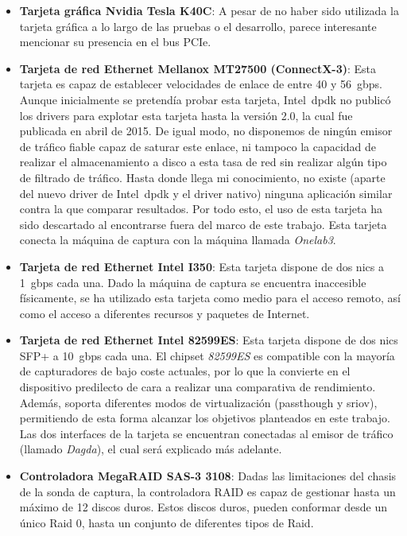 \begin{itemize}
\item \textbf{Tarjeta gráfica Nvidia Tesla K40C}: A pesar de no haber sido utilizada la tarjeta gráfica a lo largo de las pruebas o el desarrollo, parece interesante mencionar su presencia en el bus PCIe.

\item \textbf{Tarjeta de red Ethernet Mellanox MT27500 (ConnectX-3)}: Esta tarjeta es capaz de establecer velocidades de enlace de entre 40 y 56~\gls{gbps}. Aunque inicialmente se pretendía probar esta tarjeta, Intel~\gls{dpdk} no publicó los drivers para explotar esta tarjeta hasta la versión 2.0, la cual fue publicada en abril de 2015. De igual modo, no disponemos de ningún emisor de tráfico fiable capaz de saturar este enlace, ni tampoco la capacidad de realizar el almacenamiento a disco a esta tasa de red sin realizar algún tipo de filtrado de tráfico. Hasta donde llega mi conocimiento, no existe (aparte del nuevo driver de Intel~\gls{dpdk} y el driver nativo) ninguna aplicación similar contra la que comparar resultados. Por todo esto, el uso de esta tarjeta ha sido descartado al encontrarse fuera del marco de este trabajo. Esta tarjeta conecta la máquina de captura con la máquina llamada \textit{Onelab3}.

\item \textbf{Tarjeta de red Ethernet Intel I350}: Esta tarjeta dispone de dos \glspl{nic} a 1~\gls{gbps} cada una. Dado la máquina de captura se encuentra inaccesible físicamente, se ha utilizado esta tarjeta como medio para el acceso remoto, así como el acceso a diferentes recursos y paquetes de Internet.

\item \textbf{Tarjeta de red Ethernet Intel 82599ES}: Esta tarjeta dispone de dos \glspl{nic} SFP+ a 10~\gls{gbps} cada una. El chipset \textit{82599ES} es compatible con la mayoría de capturadores de bajo coste actuales, por lo que la convierte en el dispositivo predilecto de cara a realizar una comparativa de rendimiento. Además, soporta diferentes modos de virtualización (\gls{passthough} y \gls{sriov}), permitiendo de esta forma alcanzar los objetivos planteados en este trabajo. Las dos interfaces de la tarjeta se encuentran conectadas al emisor de tráfico (llamado \textit{Dagda}), el cual será explicado más adelante.

\item \textbf{Controladora MegaRAID SAS-3 3108}: Dadas las limitaciones del chasis de la sonda de captura, la controladora RAID es capaz de gestionar hasta un máximo de 12 discos duros. Estos discos duros, pueden conformar desde un único Raid 0, hasta un conjunto de diferentes tipos de Raid. 
\end{itemize}


